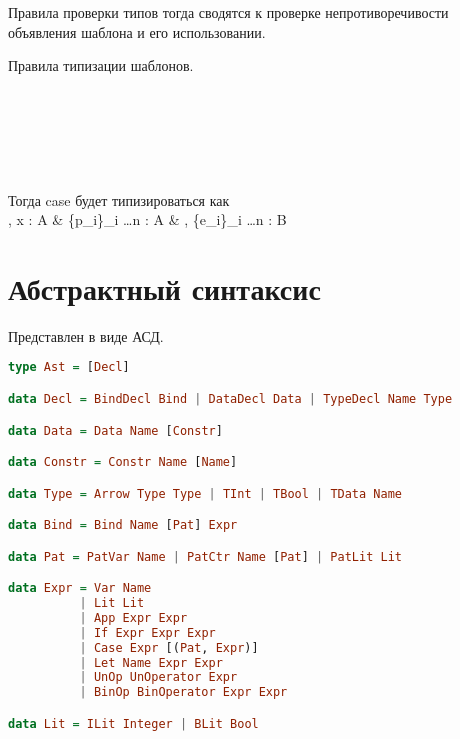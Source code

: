 \documentclass[12pt, a4paper] {ncc}
\begin{document}
Правила проверки типов тогда сводятся к проверке непротиворечивости
объявления шаблона и его использовании.

Правила типизации шаблонов.


\ \\

\ \\

\ \\

Тогда case будет типизироваться как \\

 {
	\Gamma, \Delta \vdash x : A &
	\Delta \vdash \{p_i\}_{i  \ldots n} : A &
	\Gamma, \Delta \vdash \{e_i\}_{i  \ldots n} : B
}

\section{Абстрактный синтаксис}

Представлен в виде АСД.

\begin{lstlisting}[language=Haskell]
type Ast = [Decl]

data Decl = BindDecl Bind | DataDecl Data | TypeDecl Name Type

data Data = Data Name [Constr]

data Constr = Constr Name [Name]

data Type = Arrow Type Type | TInt | TBool | TData Name

data Bind = Bind Name [Pat] Expr

data Pat = PatVar Name | PatCtr Name [Pat] | PatLit Lit

data Expr = Var Name
          | Lit Lit
          | App Expr Expr
          | If Expr Expr Expr
          | Case Expr [(Pat, Expr)]
          | Let Name Expr Expr
          | UnOp UnOperator Expr
          | BinOp BinOperator Expr Expr

data Lit = ILit Integer | BLit Bool

\end{lstlisting}
\end{document}
